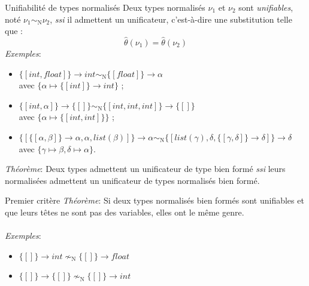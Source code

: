\documentclass[serif]{beamer}
\newcommand{\exemples}{\textit{Exemples}\xspace}
\newcommand{\theoreme}{\textit{Théorème}\xspace}
\newcommand{\mset}[1]{\{\![#1]\!\}}
\newcommand{\ssi}{\textit{ssi}\xspace}
\newcommand{\N}{\mathrm{N}}
\begin{document}
\begin{frame}{Unifiabilité de types normalisés}
\footnotesize
Deux types normalisés $\nu_1$ et $\nu_2$ sont \emph{unifiables}, noté $\nu_1 \sim_\N \nu_2$, \ssi il admettent un unificateur, c'est-à-dire une substitution telle que :
\[ \hat\theta (\nu_1) = \hat\theta (\nu_2) \]
\exemples :
\begin{itemize}
	\item $\mset{int, float} \rightarrow int \sim_\N \mset{float} \rightarrow \alpha$ \\ avec $\{ \alpha \mapsto \mset{int} \rightarrow int \}$ ;
	\item $\mset{int, \alpha} \rightarrow \mset{} \sim_\N \mset{int, int, int} \rightarrow \mset{}$ \\ avec $\{ \alpha \mapsto \mset{int, int} \}$ ;
	\item $\mset{\mset{\alpha, \beta} \rightarrow \alpha, \alpha, list (\beta)} \rightarrow \alpha \sim_\N \mset{list (\gamma), \delta, \mset{\gamma, \delta} \rightarrow \delta} \rightarrow \delta$ \\ avec $\{ \gamma \mapsto \beta, \delta \mapsto \alpha \}$.
\end{itemize}
\bigskip
\theoreme : Deux types admettent un unificateur de type bien formé \ssi leurs normalisées admettent un unificateur de types normalisés bien formé.
\end{frame}


\begin{frame}{Premier critère}
\small
\theoreme : Si deux types normalisés bien formés sont unifiables et que leurs têtes ne sont pas des variables, elles ont le même genre.
\\~\\
\exemples :
\begin{itemize}
	\item $\mset{} \rightarrow int \nsim_\N \mset{} \rightarrow float$
	\item $\mset{} \rightarrow \mset{} \nsim_\N \mset{} \rightarrow int$
\end{itemize}
\end{frame}

\end{document}
